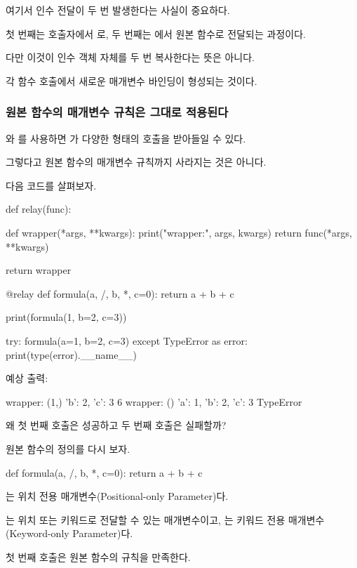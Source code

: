 여기서 인수 전달이 두 번 발생한다는 사실이 중요하다.

첫 번째는 호출자에서 로, 두 번째는 에서 원본 함수로 전달되는 과정이다.

다만 이것이 인수 객체 자체를 두 번 복사한다는 뜻은 아니다.

각 함수 호출에서 새로운 매개변수 바인딩이 형성되는 것이다.

\subsubsection{원본 함수의 매개변수 규칙은 그대로 적용된다}

와 를 사용하면 가 다양한 형태의 호출을 받아들일 수 있다.

그렇다고 원본 함수의 매개변수 규칙까지 사라지는 것은 아니다.

다음 코드를 살펴보자.

\begin{dhkcode}
def relay(func):

    def wrapper(*args, **kwargs):
        print("wrapper:", args, kwargs)
        return func(*args, **kwargs)

    return wrapper


@relay
def formula(a, /, b, *, c=0):
    return a + b + c


print(formula(1, b=2, c=3))

try:
    formula(a=1, b=2, c=3)
except TypeError as error:
    print(type(error).__name__)
\end{dhkcode}

예상 출력:

\begin{dhkzsh}
wrapper: (1,) {'b': 2, 'c': 3}
6
wrapper: () {'a': 1, 'b': 2, 'c': 3}
TypeError
\end{dhkzsh}

왜 첫 번째 호출은 성공하고 두 번째 호출은 실패할까?

원본 함수의 정의를 다시 보자.

\begin{dhkcode}
def formula(a, /, b, *, c=0):
    return a + b + c
\end{dhkcode}

는 위치 전용 매개변수(Positional-only Parameter)다.

는 위치 또는 키워드로 전달할 수 있는 매개변수이고, 는 키워드 전용 매개변수(Keyword-only Parameter)다.

첫 번째 호출은 원본 함수의 규칙을 만족한다.

